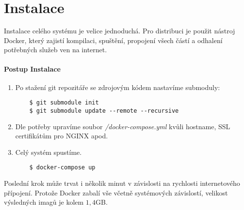 
\chapter{Instalace} \label{analyza}

Instalace celého systému je velice jednoduchá. Pro distribuci je použit nástroj
Docker, který zajistí kompilaci, spuštění, propojení všech částí a odhalení
potřebných služeb ven na internet. \citep[viz][]{DockerDocs}


\subsubsection*{Postup Instalace}

\begin{enumerate}
  \item Po stažení git repozitáře se zdrojovým kódem nastavíme submoduly:\\
  \begin{lstlisting}
    $ git submodule init
    $ git submodule update --remote --recursive
  \end{lstlisting}
  \item Dle potřeby upravíme soubor \textit{/docker-compose.yml} kvůli hostname, SSL certifikátům pro NGINX apod.
  \item Celý systém spustíme.\\
  \begin{lstlisting}
    $ docker-compose up
  \end{lstlisting}
\end{enumerate}

Poslední krok může trvat i několik minut v závislosti na rychlosti internetového
přípojení. Protože Docker zabalí vše včetně systémových závislostí, velikost
výsledných imagů je kolem $1,4$GB.

